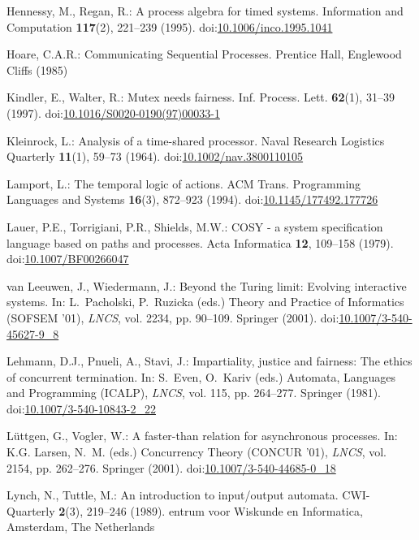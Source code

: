 \documentclass[smallcondensed]{svjour3}
\providecommand{\urlalt}[2]{\href{#1}{#2}}
\providecommand{\doi}[1]{doi:\urlalt{http://dx.doi.org/#1}{#1}}
\newcounter {part}
\begin{document}
\begin{thebibliography}{10}
Hennessy, M., Regan, R.: A process algebra for timed systems.
\newblock Information and Computation \textbf{117}(2), 221--239 (1995).
\newblock \doi{10.1006/inco.1995.1041}

Hoare, C.A.R.: Communicating Sequential Processes.
\newblock Prentice Hall, Englewood Cliffs (1985)

Kindler, E., Walter, R.: Mutex needs fairness.
\newblock Inf. Process. Lett. \textbf{62}(1), 31--39 (1997).
\newblock \doi{10.1016/S0020-0190(97)00033-1}

Kleinrock, L.: Analysis of a time-shared processor.
\newblock Naval Research Logistics Quarterly \textbf{11}(1), 59--73 (1964).
\newblock \doi{10.1002/nav.3800110105}

Lamport, L.: The temporal logic of actions.
\newblock ACM Trans. Programming Languages and Systems \textbf{16}(3), 872--923
  (1994).
\newblock \doi{10.1145/177492.177726}

Lauer, P.E., Torrigiani, P.R., Shields, M.W.: {COSY} - a system specification
  language based on paths and processes.
\newblock Acta Informatica \textbf{12}, 109--158 (1979).
\newblock \doi{10.1007/BF00266047}

van Leeuwen, J., Wiedermann, J.: Beyond the {Turing} limit: Evolving
  interactive systems.
\newblock In: L.~Pacholski, P.~Ruzicka (eds.) Theory and Practice of
  Informatics (SOFSEM '01), \emph{\rm LNCS}, vol. 2234, pp. 90--109. Springer
  (2001).
\newblock \doi{10.1007/3-540-45627-9\_8}

Lehmann, D.J., Pnueli, A., Stavi, J.: Impartiality, justice and fairness: The
  ethics of concurrent termination.
\newblock In: S.~Even, O.~Kariv (eds.) Automata, Languages and Programming
  (ICALP), \emph{\rm LNCS}, vol. 115, pp. 264--277. Springer (1981).
\newblock \doi{10.1007/3-540-10843-2\_22}

L\"{u}ttgen, G., Vogler, W.: A faster-than relation for asynchronous processes.
\newblock In: K.G. Larsen, N.~M. (eds.) Concurrency Theory (CONCUR '01),
  \emph{\rm LNCS}, vol. 2154, pp. 262--276. Springer (2001).
\newblock \doi{10.1007/3-540-44685-0\_18}

Lynch, N., Tuttle, M.: An introduction to input/output automata.
\newblock CWI-Quarterly \textbf{2}(3), 219--246 (1989).
entrum voor Wiskunde en Informatica, Amsterdam, The Netherlands


\end{thebibliography}
\end{document}
